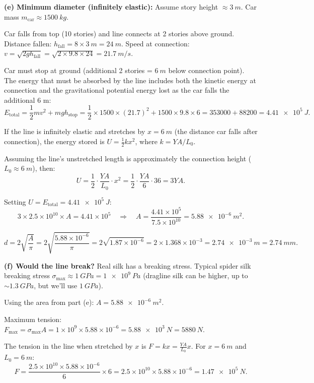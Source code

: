 \documentclass[11pt]{article}
\newcommand{\ans}[1]{\boxed{\displaystyle #1}}
\begin{document}
\textbf{(e) Minimum diameter (infinitely elastic):} Assume story height $\approx \SI{3}{m}$. Car mass $m_{\text{car}} \approx \SI{1500}{kg}$.

Car falls from top (10 stories) and line connects at 2 stories above ground. Distance fallen: $h_{\text{fall}} = 8 \times \SI{3}{m} = \SI{24}{m}$. Speed at connection: $v = \sqrt{2gh_{\text{fall}}} = \sqrt{2 \times 9.8 \times 24} = \SI{21.7}{m/s}$.

Car must stop at ground (additional 2 stories = $\SI{6}{m}$ below connection point). The energy that must be absorbed by the line includes both the kinetic energy at connection and the gravitational potential energy lost as the car falls the additional 6 m:
\[ E_{\text{total}} = \frac{1}{2}mv^2 + mgh_{\text{stop}} = \frac{1}{2} \times 1500 \times (21.7)^2 + 1500 \times 9.8 \times 6 = 353000 + 88200 = \SI{4.41e5}{J}. \]

If the line is infinitely elastic and stretches by $x = \SI{6}{m}$ (the distance car falls after connection), the energy stored is $U = \frac{1}{2}kx^2$, where $k = YA/L_0$.

Assuming the line's unstretched length is approximately the connection height ($L_0 \approx \SI{6}{m}$), then:
\[ U = \frac{1}{2} \cdot \frac{YA}{L_0} \cdot x^2 = \frac{1}{2} \cdot \frac{YA}{6} \cdot 36 = 3YA. \]

Setting $U = E_{\text{total}} = \SI{4.41e5}{J}$:
\[ 3 \times 2.5 \times 10^{10} \times A = 4.41 \times 10^5 \quad\Rightarrow\quad A = \frac{4.41 \times 10^5}{7.5 \times 10^{10}} = \SI{5.88e-6}{m^2}. \]

\[ d = 2\sqrt{\frac{A}{\pi}} = 2\sqrt{\frac{5.88 \times 10^{-6}}{\pi}} = 2\sqrt{1.87 \times 10^{-6}} = 2 \times 1.368 \times 10^{-3} = \ans{\SI{2.74e-3}{m} = \SI{2.74}{mm}}. \]

\textbf{(f) Would the line break?} Real silk has a breaking stress. Typical spider silk breaking stress $\sigma_{\text{max}} \approx \SI{1}{GPa} = \SI{1e9}{Pa}$ (dragline silk can be higher, up to $\sim\SI{1.3}{GPa}$, but we'll use $\SI{1}{GPa}$).

Using the area from part (e): $A = \SI{5.88e-6}{m^2}$.

Maximum tension: $F_{\text{max}} = \sigma_{\text{max}} A = 1 \times 10^9 \times 5.88 \times 10^{-6} = \SI{5.88e3}{N} = \SI{5880}{N}$.

The tension in the line when stretched by $x$ is $F = kx = \frac{YA}{L_0}x$. For $x = \SI{6}{m}$ and $L_0 = \SI{6}{m}$:
\[ F = \frac{2.5 \times 10^{10} \times 5.88 \times 10^{-6}}{6} \times 6 = 2.5 \times 10^{10} \times 5.88 \times 10^{-6} = \SI{1.47e5}{N}. \]
\end{document}
